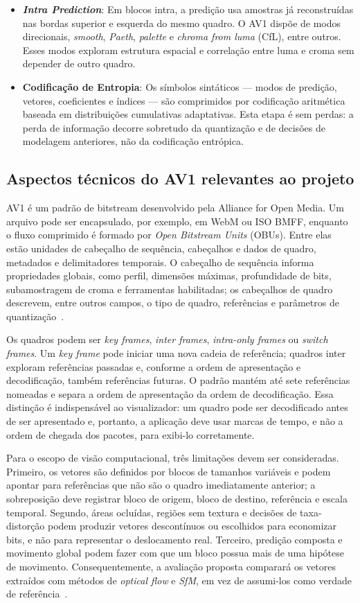 \documentclass[a4paper,titlepage]{article}
\begin{document}
\begin{itemize}
    \item \textbf{\emph{Intra Prediction}}: Em blocos intra, a predição usa amostras já reconstruídas nas bordas superior e esquerda do mesmo quadro. O AV1 dispõe de modos direcionais, \emph{smooth}, \emph{Paeth}, \emph{palette} e \emph{chroma from luma} (CfL), entre outros. Esses modos exploram estrutura espacial e correlação entre luma e croma sem depender de outro quadro.
    \item \textbf{Codificação de Entropia}: Os símbolos sintáticos --- modos de predição, vetores, coeficientes e índices --- são comprimidos por codificação aritmética baseada em distribuições cumulativas adaptativas. Esta etapa é sem perdas: a perda de informação decorre sobretudo da quantização e de decisões de modelagem anteriores, não da codificação entrópica.
\end{itemize}

\subsection{Aspectos técnicos do AV1 relevantes ao projeto}

AV1 é um padrão de bitstream desenvolvido pela Alliance for Open Media. Um arquivo pode ser encapsulado, por exemplo, em WebM ou ISO BMFF, enquanto o fluxo comprimido é formado por \emph{Open Bitstream Units} (OBUs). Entre elas estão unidades de cabeçalho de sequência, cabeçalhos e dados de quadro, metadados e delimitadores temporais. O cabeçalho de sequência informa propriedades globais, como perfil, dimensões máximas, profundidade de bits, subamostragem de croma e ferramentas habilitadas; os cabeçalhos de quadro descrevem, entre outros campos, o tipo de quadro, referências e parâmetros de quantização~\cite{aomedia2021av1}.

Os quadros podem ser \emph{key frames}, \emph{inter frames}, \emph{intra-only frames} ou \emph{switch frames}. Um \emph{key frame} pode iniciar uma nova cadeia de referência; quadros inter exploram referências passadas e, conforme a ordem de apresentação e decodificação, também referências futuras. O padrão mantém até sete referências nomeadas e separa a ordem de apresentação da ordem de decodificação. Essa distinção é indispensável ao visualizador: um quadro pode ser decodificado antes de ser apresentado e, portanto, a aplicação deve usar marcas de tempo, e não a ordem de chegada dos pacotes, para exibi-lo corretamente.

Para o escopo de visão computacional, três limitações devem ser consideradas. Primeiro, os vetores são definidos por blocos de tamanhos variáveis e podem apontar para referências que não são o quadro imediatamente anterior; a sobreposição deve registrar bloco de origem, bloco de destino, referência e escala temporal. Segundo, áreas ocluídas, regiões sem textura e decisões de taxa-distorção podem produzir vetores descontínuos ou escolhidos para economizar bits, e não para representar o deslocamento real. Terceiro, predição composta e movimento global podem fazer com que um bloco possua mais de uma hipótese de movimento. Consequentemente, a avaliação proposta comparará os vetores extraídos com métodos de \emph{optical flow} e \emph{SfM}, em vez de assumi-los como verdade de referência~\cite{av1motion}.
\end{document}
